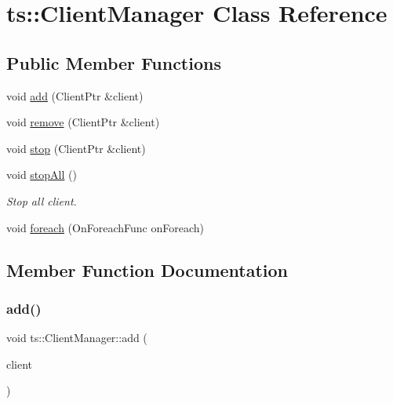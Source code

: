 \hypertarget{classts_1_1_client_manager}{}\section{ts\+:\+:Client\+Manager Class Reference}
\label{classts_1_1_client_manager}
\subsection*{Public Member Functions}
\begin{DoxyCompactItemize}
\item 
void \hyperlink{classts_1_1_client_manager_a259240643ded77312811f4d4c781c8df}{add} (Client\+Ptr \&client)
\item 
void \hyperlink{classts_1_1_client_manager_a3d622eee3a7d3101d5c77f2dc5f241c2}{remove} (Client\+Ptr \&client)
\item 
void \hyperlink{classts_1_1_client_manager_a1622242546ab02fe20ad844c519cbc0a}{stop} (Client\+Ptr \&client)
\item 
\mbox{\label{classts_1_1_client_manager_ab5c1ba814ab730711082ca77bbcfbc97}} 
void \hyperlink{classts_1_1_client_manager_ab5c1ba814ab730711082ca77bbcfbc97}{stop\+All} ()
\begin{DoxyCompactList}\small\item\em Stop all client. \end{DoxyCompactList}\item 
void \hyperlink{classts_1_1_client_manager_a4bf9aa9c7ef6f10ae11a8c3408183ed3}{foreach} (On\+Foreach\+Func on\+Foreach)
\end{DoxyCompactItemize}


\subsection{Member Function Documentation}
\mbox{\label{classts_1_1_client_manager_a259240643ded77312811f4d4c781c8df}} 
\subsubsection{\texorpdfstring{add()}{add()}}
{\footnotesize\ttfamily void ts\+::\+Client\+Manager\+::add (\begin{DoxyParamCaption}\item[{Client\+Ptr \&}]{client }\end{DoxyParamCaption})}

